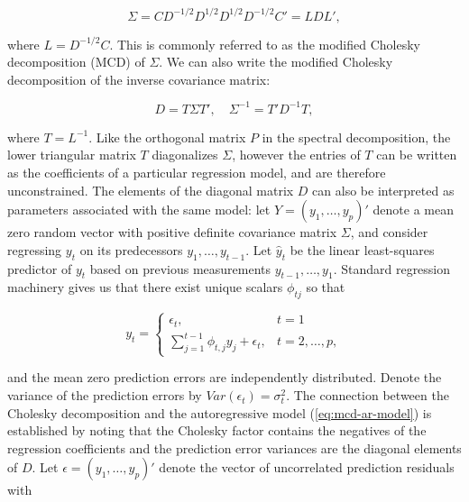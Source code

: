 \begin{equation}\label{eq:standard-cholesky-decomposition-transform}
\Sigma = CD^{-1/2}D^{1/2} D^{1/2} D^{-1/2}C' = L D L',
\end{equation}

\noindent
where $L = D^{-1/2}C$. This is commonly referred to as the modified Cholesky decomposition (MCD) of $\Sigma$. We can also write the modified Cholesky decomposition of the inverse covariance matrix:

\begin{equation}\label{eq:modified-cholesky-decomposition}
D = T\Sigma T', \quad \Sigma^{-1} = T'D^{-1} T,
\end{equation}

 \noindent
where $T = L^{-1}$. Like the orthogonal matrix $P$ in the spectral decomposition, the lower triangular matrix $T$ diagonalizes $\Sigma$, however the entries of $T$ can be written as the coefficients of a particular regression model, and are therefore unconstrained. The elements of the diagonal matrix $D$ can also be interpreted as parameters associated with the same model: let $Y = \left( y_1,\dots, y_p \right)'$ denote a mean zero random vector with positive definite covariance matrix $\Sigma$, and consider regressing $y_t$ on its predecessors $y_1, \dots, y_{t-1}$. Let $\hat{y}_t$ be the linear least-squares predictor of $y_t$ based on previous measurements $y_{t-1}, \dots , y_1$. Standard regression machinery gives us that there exist unique scalars $\phi_{tj}$ so that

\begin{equation} \label{eq:mcd-ar-model}
y_t = \left\{ \begin{array}{ll} \epsilon_t, & t = 1\\
\sum_{j = 1}^{t-1} \phi_{t,j} y_j + \epsilon_t, & t = 2, \dots, p,
\end{array}\right.
\end{equation}

\noindent
and the mean zero prediction errors are independently distributed. Denote the variance of the prediction errors by $Var\left(\epsilon_t\right) = \sigma_t^2 $. The connection between the Cholesky decomposition and the autoregressive model (\ref{eq:mcd-ar-model}) is established by noting that the Cholesky factor contains the negatives of the regression coefficients and the prediction error variances are the diagonal elements of $D$.  Let $\epsilon = \left(y_1, \dots, y_p\right)'$ denote the vector of uncorrelated prediction residuals with

